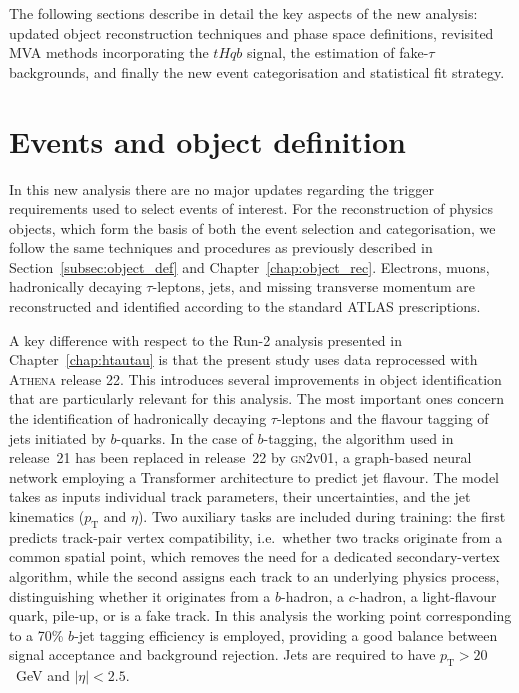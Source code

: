 The following sections describe in detail the key aspects of the new analysis: updated object reconstruction techniques and phase space definitions, revisited MVA methods incorporating the $tHqb$ signal, the estimation of fake-$\tau$ backgrounds, and finally the new event categorisation and statistical fit strategy.


\section{Events and object definition}

In this new analysis there are no major updates regarding the trigger requirements used to select events of interest. For the reconstruction of physics objects, which form the basis of both the event selection and categorisation, we follow the same techniques and procedures as previously described in Section~\ref{subsec:object_def} and Chapter~\ref{chap:object_rec}. Electrons, muons, hadronically decaying $\tau$-leptons, jets, and missing transverse momentum are reconstructed and identified according to the standard ATLAS prescriptions.

A key difference with respect to the Run-2 analysis presented in Chapter~\ref{chap:htautau} is that the present study uses data reprocessed with \textsc{Athena} release 22. This introduces several improvements in object identification that are particularly relevant for this analysis. The most important ones concern the identification of hadronically decaying $\tau$-leptons and the flavour tagging of jets initiated by $b$-quarks. In the case of $b$-tagging, the algorithm used in release~21 has been replaced in release~22 by \textsc{gn2v01}, a graph-based neural network employing a Transformer architecture to predict jet flavour. The model takes as inputs individual track parameters, their uncertainties, and the jet kinematics ($p_{\mathrm{T}}$ and $\eta$). Two auxiliary tasks are included during training: the first predicts track-pair vertex compatibility, i.e.\ whether two tracks originate from a common spatial point, which removes the need for a dedicated secondary-vertex algorithm, while the second assigns each track to an underlying physics process, distinguishing whether it originates from a $b$-hadron, a $c$-hadron, a light-flavour quark, pile-up, or is a fake track. In this analysis the working point corresponding to a 70\% $b$-jet tagging efficiency is employed, providing a good balance between signal acceptance and background rejection. Jets are required to have $p_{\mathrm{T}}>20$~GeV and $|\eta|<2.5$.

